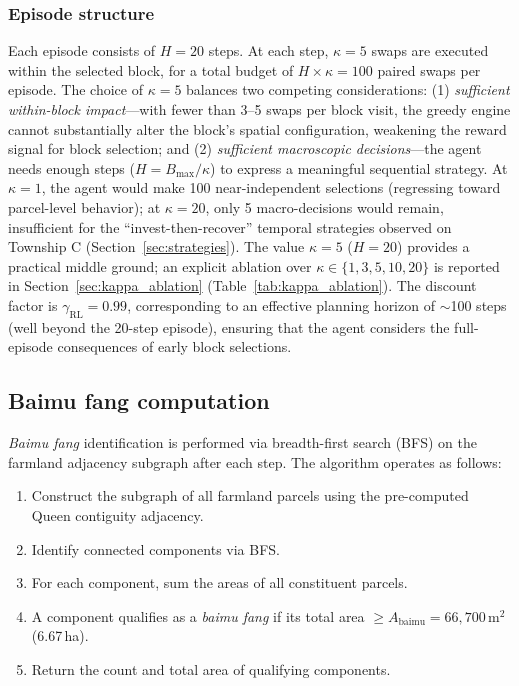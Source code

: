 \documentclass[preprint,12pt]{elsarticle}
\begin{document}
\subsubsection{Episode structure}

Each episode consists of $H = 20$ steps. At each step, $\kappa = 5$ swaps are executed within the selected block, for a total budget of $H \times \kappa = 100$ paired swaps per episode. The choice of $\kappa = 5$ balances two competing considerations: (1) \textit{sufficient within-block impact}---with fewer than 3--5 swaps per block visit, the greedy engine cannot substantially alter the block's spatial configuration, weakening the reward signal for block selection; and (2) \textit{sufficient macroscopic decisions}---the agent needs enough steps ($H = B_{\max}/\kappa$) to express a meaningful sequential strategy. At $\kappa = 1$, the agent would make 100 near-independent selections (regressing toward parcel-level behavior); at $\kappa = 20$, only 5 macro-decisions would remain, insufficient for the ``invest-then-recover'' temporal strategies observed on Township C (Section~\ref{sec:strategies}). The value $\kappa = 5$ ($H = 20$) provides a practical middle ground; an explicit ablation over $\kappa \in \{1,3,5,10,20\}$ is reported in Section~\ref{sec:kappa_ablation} (Table~\ref{tab:kappa_ablation}). The discount factor is $\gamma_{\text{RL}} = 0.99$, corresponding to an effective planning horizon of $\sim$100 steps (well beyond the 20-step episode), ensuring that the agent considers the full-episode consequences of early block selections.

\subsection{Baimu fang computation}
\label{sec:baimu}

\textit{Baimu fang} identification is performed via breadth-first search (BFS) on the farmland adjacency subgraph after each step. The algorithm operates as follows:

\begin{enumerate}
\item Construct the subgraph of all farmland parcels using the pre-computed Queen contiguity adjacency.
\item Identify connected components via BFS.
\item For each component, sum the areas of all constituent parcels.
\item A component qualifies as a \textit{baimu fang} if its total area $\geq A_{\text{baimu}} = 66{,}700$\,m$^2$ (6.67\,ha).
\item Return the count and total area of qualifying components.
\end{enumerate}
\end{document}

